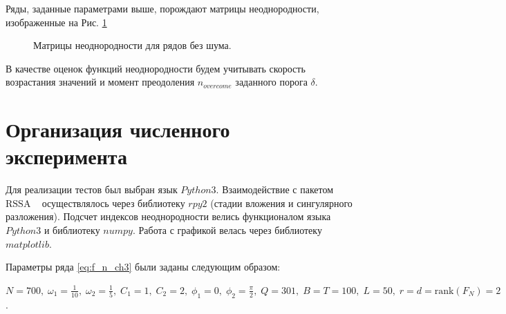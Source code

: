 \documentclass[specialist, substylefile = spbu.rtx,
			   subf, href, 12pt]{disser}
\begin{document}
Ряды, заданные параметрами выше, порождают матрицы неоднородности, изображенные на Рис. \ref{pic:heterogeneity_types}
\begin{figure}[!hhh]
	\caption{Матрицы неоднородности для рядов без шума.}
	\label{pic:heterogeneity_types}
\end{figure}


В качестве оценок функций неоднородности будем учитывать скорость возрастания значений и момент преодоления $n_{overcome}$ заданного порога $\delta$.


\section{Организация численного эксперимента}
Для реализации тестов был выбран язык $Python3$. Взаимодействие с пакетом $\mathrm{RSSA}$ ~\cite{rssa_package, RSSA_BASIC, RSSA, RSSA_MULTIVATIATE} осуществлялось через библиотеку $rpy2$ (стадии вложения и сингулярного разложения). Подсчет индексов неоднородности велись функционалом языка $Python3$ и библиотеку $numpy$. Работа с графикой велась через библиотеку $matplotlib$. 

Параметры ряда \eqref{eq:f_n_ch3} были заданы следующим образом: 

$ N = 700, \;\omega_1 = \frac{1}{10},\; \omega_2 = \frac{1}{5},\; C_1 = 1, \; C_2 = 2,\; \phi_1=0,\; \phi_2=\frac{\pi}{2},\; Q = 301,\; B = T = 100,\; L = 50,\; r=d=\mathrm{rank}(F_N)=2$.
\end{document}
